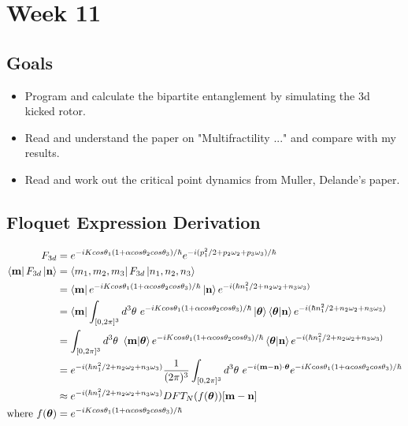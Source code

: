 \documentclass[12pt]{article}
\begin{document}
\section{Week 11}
\subsection{Goals}
\begin{itemize}
    \item Program and calculate the bipartite entanglement
    by simulating the 3d kicked rotor.

    \item Read and understand the paper on "Multifractility ..."
    and compare with my results.

    \item Read and work out the critical point dynamics from
    Muller, Delande's paper.
\end{itemize}

\subsection{Floquet Expression Derivation}

\begin{align*}
    F_{3d} &= e^{-i K cos\theta_1 (1 + \alpha cos\theta_2 cos\theta_3) / \hbar}
    e^{-i (p_1^2 / 2 + p_2 \omega_2 + p_3 \omega_3)/\hbar} \\
    \bra{\mathbf{m}} F_{3d} \ket{\mathbf{n}} &=
    \bra{m_1, m_2, m_3}F_{3d}\ket{n_1, n_2, n_3} \\
    &= \bra{\mathbf{m}}
    e^{-i K cos\theta_1 (1 + \alpha cos\theta_2 cos\theta_3) / \hbar}
    \ket{\mathbf{n}} e^{-i (\hbar n_1^2 / 2 + n_2 \omega_2 + n_3 \omega_3)} \\
    &= \bra{\mathbf{m}} \int_{[0,2\pi]^3} d^3\theta \
    e^{-i K cos\theta_1 (1 + \alpha cos\theta_2 cos\theta_3) / \hbar}
    \ket{\boldsymbol{\theta}}\braket{\boldsymbol{\theta}|\mathbf{n}}
    e^{-i (\hbar n_1^2 / 2 + n_2 \omega_2 + n_3 \omega_3)} \\
    &= \int_{[0,2\pi]^3} d^3\theta \ \braket{\mathbf{m}|\boldsymbol{\theta}}
    e^{-i K cos\theta_1 (1 + \alpha cos\theta_2 cos\theta_3) / \hbar}
    \braket{\boldsymbol{\theta}|\mathbf{n}}
    e^{-i (\hbar n_1^2 / 2 + n_2 \omega_2 + n_3 \omega_3)} \\
    &= e^{-i (\hbar n_1^2 / 2 + n_2 \omega_2 + n_3 \omega_3)}
    \frac{1}{(2\pi)^3} \int_{[0,2\pi]^3} d^3\theta \
    e^{-i(\mathbf{m} - \mathbf{n})\cdot \boldsymbol{\theta}}
    e^{-i K cos\theta_1 (1 + \alpha cos\theta_2 cos\theta_3) / \hbar}\\
    &\approx e^{-i (\hbar n_1^2 / 2 + n_2 \omega_2 + n_3 \omega_3)}
    DFT_N(f(\boldsymbol{\theta}))[\mathbf{m} - \mathbf{n}]\\
    \text{where }
    f(\boldsymbol{\theta}) &=
    e^{-i K cos\theta_1 (1 + \alpha cos\theta_2 cos\theta_3) / \hbar}
\end{align*}

\nocite{*}
\printbibliography
\end{document}
